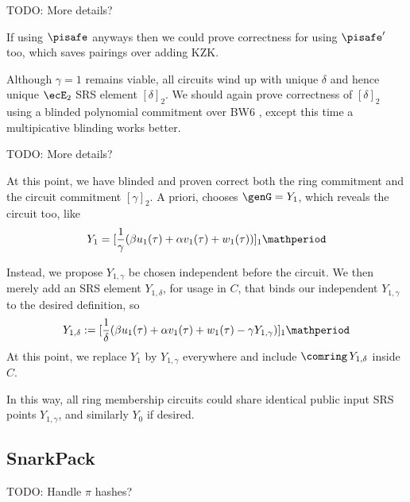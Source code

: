 TODO: More details?

If using $\pisafe$ anyways then we could prove correctness for \comring
using $\pisafe'$ too, which saves pairings over adding KZK.

\smallskip

Although $\gamma=1$ remains viable, all circuits wind up with
unique $\delta$ and hence unique $\ecE_2$ SRS element $[\delta]_2$.
We should again prove correctness of $[\delta]_2$ using a
blinded polynomial commitment \cite{KZG} over BW6 \cite{BW6},
except this time a multipicative blinding works better.

TODO: More details?

At this point, we have blinded and proven correct both the
ring commitment \comring and the circuit commitment $[\gamma]_2$.
A priori, \pifast chooses $\genG = Y_1$, which reveals the circuit too, like
$$ Y_1 = [{1\over\gamma} (\beta u_1(\tau) + \alpha v_1(\tau) + w_1(\tau))]_1 \mathperiod $$

Instead, we propose $Y_{1,\gamma}$ be chosen independent before the circuit.
We then merely add an SRS element $Y_{1,\delta}$, for usage in $C$, that binds
 our independent $Y_{1,\gamma}$ to the desired definition, so
$$ Y_{1,\delta} := [{1\over\delta} (\beta u_1(\tau) + \alpha v_1(\tau) + w_1(\tau) - \gamma Y_{1,\gamma})]_1 \mathperiod $$
At this point, we replace $Y_1$ by $Y_{1,\gamma}$ everywhere and
 include $\comring \, Y_{1,\delta}$ inside $C$.

In this way, all ring membership circuits could share identical
public input SRS points $Y_{1,\gamma}$, and similarly $Y_0$ if desired.


\subsection{SnarkPack}

TODO: Handle $\pi$ hashes?


